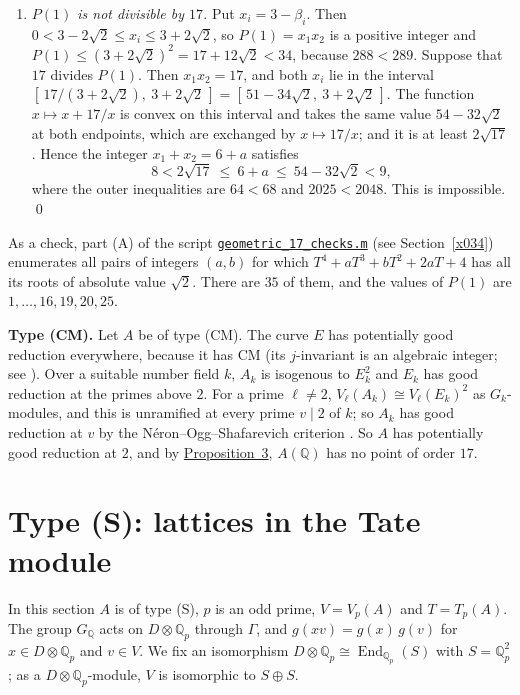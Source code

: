\documentclass[11pt]{article}
\newcommand{\Q}{\mathbb Q}
\DeclareMathOperator{\End}{End}
\begin{document}
\begin{enumerate}
\item \emph{\(P(1)\) is not divisible by \(17\).} Put \(x_i=3-\beta_i\). Then
\(0<3-2\sqrt2\le x_i\le3+2\sqrt2\), so \(P(1)=x_1x_2\) is a positive integer and
\(P(1)\le(3+2\sqrt2)^2=17+12\sqrt2<34\), because \(288<289\). Suppose that \(17\) divides
\(P(1)\). Then \(x_1x_2=17\), and both \(x_i\) lie in the interval
\([\,17/(3+2\sqrt2),\ 3+2\sqrt2\,]=[\,51-34\sqrt2,\ 3+2\sqrt2\,]\). The function
\(x\mapsto x+17/x\) is convex on this interval and takes the same value \(54-32\sqrt2\) at both
endpoints, which are exchanged by \(x\mapsto17/x\); and it is at least \(2\sqrt{17}\). Hence the
integer \(x_1+x_2=6+a\) satisfies
\[8<2\sqrt{17}\ \le\ 6+a\ \le\ 54-32\sqrt2<9,\]
where the outer inequalities are \(64<68\) and \(2025<2048\). This is impossible. \qed
\end{enumerate}

As a check, part (A) of the script
\href{https://genus-2-torsion.github.io/data/knowledge/sources/geometric_17_checks.m}{\texttt{geometric\_\allowbreak{}17\_\allowbreak{}checks.m}}
(see Section~\ref{x034}) enumerates all pairs of integers \((a,b)\) for which
\(T^4+aT^3+bT^2+2aT+4\) has all its roots of absolute value \(\sqrt2\). There are \(35\) of them,
and the values of \(P(1)\) are \(1,\dots,16,19,20,25\).

\medskip
\textbf{Type (CM).} Let \(A\) be of type (CM). The curve \(E\) has potentially good reduction
everywhere, because it has CM (its \(j\)-invariant is an algebraic integer; see \cite[\S2]{ST}). Over a suitable
number field \(k\), \(A_k\) is isogenous to \(E_k^2\) and \(E_k\) has good reduction at the
primes above \(2\). For a prime \(\ell\neq2\), \(V_\ell(A_k)\cong V_\ell(E_k)^2\) as
\(G_k\)-modules, and this is unramified at every prime \(v\mid2\) of \(k\); so \(A_k\) has good
reduction at \(v\) by the N\'eron--Ogg--Shafarevich criterion \cite[Theorem~1]{ST}. So \(A\) has
potentially good reduction at \(2\), and by \hyperref[prop-good]{Proposition~3}, \(A(\Q)\) has no point of order
\(17\).

\section{Type (S): lattices in the Tate module}\label{lattices}

In this section \(A\) is of type (S), \(p\) is an odd prime, \(V=V_p(A)\) and \(T=T_p(A)\). The
group \(G_{\Q}\) acts on \(D\otimes\Q_p\) through \(\Gamma\), and \(g(xv)=g(x)\,g(v)\) for
\(x\in D\otimes\Q_p\) and \(v\in V\). We fix an isomorphism
\(D\otimes\Q_p\cong\End_{\Q_p}(S)\) with \(S=\Q_p^2\); as a \(D\otimes\Q_p\)-module, \(V\) is
isomorphic to \(S\oplus S\).
\end{document}
